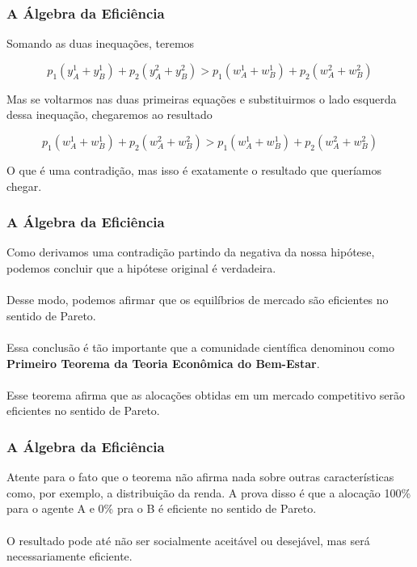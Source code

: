 \documentclass{beamer}[10]
\begin{document}
\begin{frame}
	\frametitle{A Álgebra da Eficiência}

	Somando as duas inequações, teremos

	$$p_1(y_A^1 + y_B^1) + p_2(y_A^2 + y_B^2) > p_1(w_A^1 + w_ B^1) + p_2(w_A^2 + w_ B^2)$$

	Mas se voltarmos nas duas primeiras equações e substituirmos o lado esquerda dessa inequação, chegaremos ao resultado

	$$p_1(w_A^1 + w_ B^1) + p_2(w_A^2 + w_ B^2) > p_1(w_A^1 + w_ B^1) + p_2(w_A^2 + w_ B^2)$$

	O que é uma contradição, mas isso é exatamente o resultado que queríamos chegar.

\end{frame}

\begin{frame}
	\frametitle{A Álgebra da Eficiência}

	Como derivamos uma contradição partindo da negativa da nossa hipótese, podemos concluir que a hipótese original é verdadeira.
	\\~\\
	Desse modo, podemos afirmar que os equilíbrios de mercado são eficientes no sentido de Pareto.
	\\~\\
	Essa conclusão é tão importante que a comunidade científica denominou como \textbf{Primeiro Teorema da Teoria Econômica do Bem-Estar}.
	\\~\\
	Esse teorema afirma que as alocações obtidas em um mercado competitivo serão eficientes no sentido de Pareto.

\end{frame}

\begin{frame}
	\frametitle{A Álgebra da Eficiência}

	Atente para o fato que o teorema não afirma nada sobre outras características como, por exemplo, a distribuição da renda. A prova disso é que a alocação 100\% para o agente A e 0\% pra o B é eficiente no sentido de Pareto. 
	\\~\\
	O resultado pode até não ser socialmente aceitável ou desejável, mas será necessariamente eficiente.

\end{frame}
\end{document}

